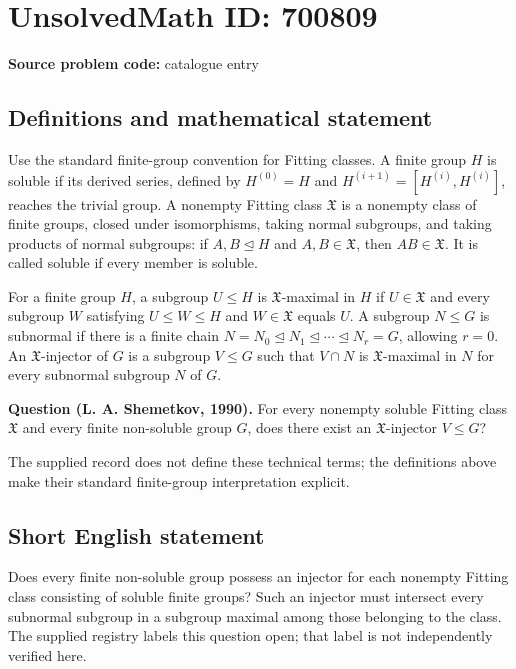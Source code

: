 \documentclass[11pt]{article}
\begin{document}
\section*{UnsolvedMath ID: 700809}
\textbf{Source problem code:} catalogue entry
\subsection{Definitions and mathematical statement}
Use the standard finite-group convention for Fitting classes. A finite group \(H\) is soluble if its derived series, defined by \(H^{(0)}=H\) and \(H^{(i+1)}=[H^{(i)},H^{(i)}]\), reaches the trivial group. A nonempty Fitting class \(\mathfrak X\) is a nonempty class of finite groups, closed under isomorphisms, taking normal subgroups, and taking products of normal subgroups: if \(A,B\trianglelefteq H\) and \(A,B\in\mathfrak X\), then \(AB\in\mathfrak X\). It is called soluble if every member is soluble.

For a finite group \(H\), a subgroup \(U\le H\) is \(\mathfrak X\)-maximal in \(H\) if \(U\in\mathfrak X\) and every subgroup \(W\) satisfying \(U\le W\le H\) and \(W\in\mathfrak X\) equals \(U\). A subgroup \(N\le G\) is subnormal if there is a finite chain \(N=N_0\trianglelefteq N_1\trianglelefteq\cdots\trianglelefteq N_r=G\), allowing \(r=0\). An \(\mathfrak X\)-injector of \(G\) is a subgroup \(V\le G\) such that \(V\cap N\) is \(\mathfrak X\)-maximal in \(N\) for every subnormal subgroup \(N\) of \(G\).

\textbf{Question (L. A. Shemetkov, 1990).} For every nonempty soluble Fitting class \(\mathfrak X\) and every finite non-soluble group \(G\), does there exist an \(\mathfrak X\)-injector \(V\le G\)?

The supplied record does not define these technical terms; the definitions above make their standard finite-group interpretation explicit.
\subsection{Short English statement}
Does every finite non-soluble group possess an injector for each nonempty Fitting class consisting of soluble finite groups? Such an injector must intersect every subnormal subgroup in a subgroup maximal among those belonging to the class. The supplied registry labels this question open; that label is not independently verified here.
\end{document}
